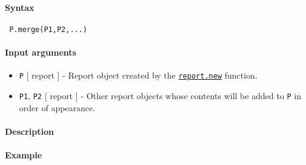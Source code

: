 


	\paragraph{Syntax}
 
 \begin{verbatim}
 P.merge(P1,P2,...)
 \end{verbatim}
 
 \paragraph{Input arguments}
 
 \begin{itemize}
 \item
   \texttt{P} {[} report {]} - Report object created by the
   \href{report/new}{\texttt{report.new}} function.
 \item
   \texttt{P1}, \texttt{P2} {[} report {]} - Other report objects whose
   contents will be added to \texttt{P} in order of appearance.
 \end{itemize}
 
 \paragraph{Description}
 
 \paragraph{Example}


